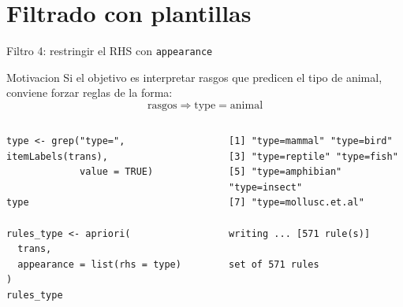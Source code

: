 \documentclass[10pt,aspectratio=169]{beamer}
\begin{document}
%

\section{Filtrado con plantillas}
\begin{frame}[fragile]{Filtro 4: restringir el RHS con \texttt{appearance}}
\begin{block}{Motivacion}
Si el objetivo es interpretar rasgos que predicen el tipo de animal, conviene forzar reglas de la forma:
\[
\mathrm{rasgos} \Rightarrow \mathrm{type=animal}
\]
\end{block}

\begin{columns}[T]
\begin{lstlisting}[style=rcode]
type <- grep("type=", itemLabels(trans),
             value = TRUE)

type

rules_type <- apriori(
  trans,
  appearance = list(rhs = type)
)
rules_type
\end{lstlisting}

\begin{lstlisting}[style=out]
[1] "type=mammal" "type=bird"
[3] "type=reptile" "type=fish"
[5] "type=amphibian" "type=insect"
[7] "type=mollusc.et.al"

writing ... [571 rule(s)]

set of 571 rules
\end{lstlisting}
\end{columns}
\end{frame}
\end{document}
